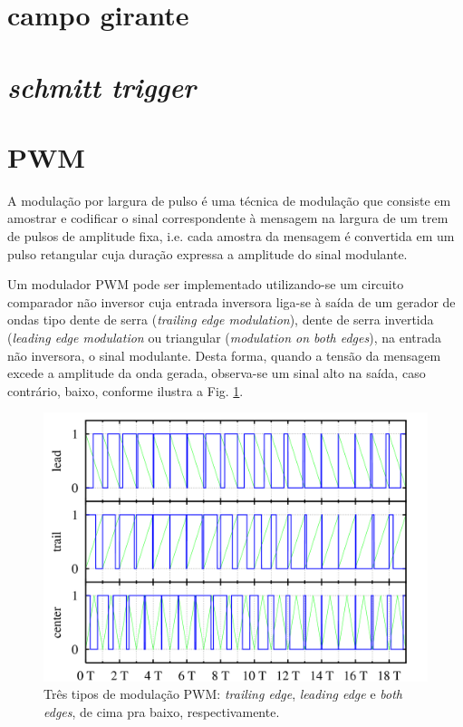 \section{campo girante}

\section{\textit{schmitt trigger}}

\section{PWM}
A modulação por largura de pulso é uma técnica de modulação que consiste em amostrar e codificar o sinal correspondente à mensagem na largura de um 
trem de pulsos de amplitude fixa, i.e. cada amostra da mensagem é convertida em um pulso retangular cuja duração expressa a amplitude do sinal 
modulante.

Um modulador PWM pode ser implementado utilizando-se um circuito comparador não inversor cuja entrada inversora liga-se à saída de um gerador de 
ondas tipo dente de serra (\textit{trailing edge modulation}), dente de serra invertida (\textit{leading edge modulation}  ou triangular 
(\textit{modulation on both edges}), na entrada não inversora, o sinal modulante. 
Desta forma, quando a tensão da mensagem excede a amplitude da onda gerada, observa-se um sinal alto na saída, caso contrário, baixo, conforme 
ilustra a Fig. \ref{pwm_modulation_types}.

  \begin{figure}[!htb] %
    \centering
    \includegraphics[width=0.7\linewidth]{../../Imagens/PWM_modulation_types.png}
    \caption{Três tipos de modulação PWM: \textit{trailing edge}, \textit{leading edge} e  \textit{both edges}, de cima pra baixo, respectivamente.}
    \label{pwm_modulation_types}
  \end{figure}
  
